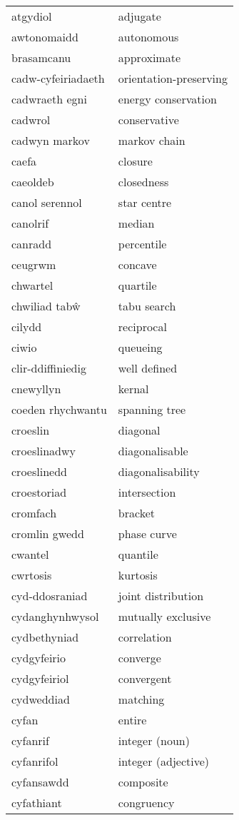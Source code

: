 \begin{supertabular}{p{0.22\textwidth}p{0.22\textwidth}}
atgydiol & adjugate \\
awtonomaidd & autonomous \\
brasamcanu & approximate \\
cadw-cyfeiriadaeth & orientation-preserving \\
cadwraeth egni & energy conservation \\
cadwrol & conservative \\
cadwyn markov & markov chain \\
caefa & closure \\
caeoldeb & closedness \\
canol serennol & star centre \\
canolrif & median \\
canradd & percentile \\
ceugrwm & concave \\
chwartel & quartile \\
chwiliad tabŵ & tabu search \\
cilydd & reciprocal \\
ciwio & queueing \\
clir-ddiffiniedig & well defined \\
cnewyllyn & kernal \\
coeden rhychwantu & spanning tree \\
croeslin & diagonal \\
croeslinadwy & diagonalisable \\
croeslinedd & diagonalisability \\
croestoriad & intersection \\
cromfach & bracket \\
cromlin gwedd & phase curve \\
cwantel & quantile \\
cwrtosis & kurtosis \\
cyd-ddosraniad & joint distribution \\
cydanghynhwysol & mutually exclusive \\
cydbethyniad & correlation \\
cydgyfeirio & converge \\
cydgyfeiriol & convergent \\
cydweddiad & matching \\
cyfan & entire \\
cyfanrif & integer (noun) \\
cyfanrifol & integer (adjective) \\
cyfansawdd & composite \\
cyfathiant & congruency \\

\end{supertabular}
